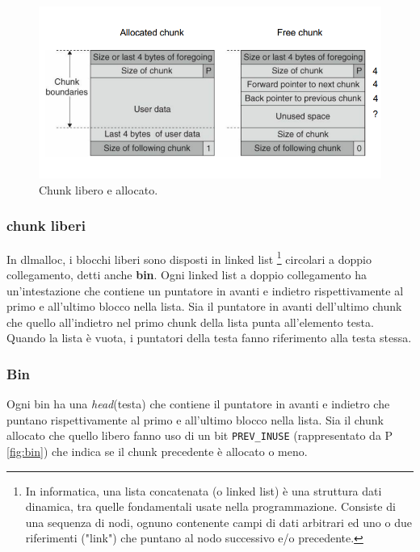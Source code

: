 \begin{figure}[H]
    \centering
    \includegraphics[width=13cm, keepaspectratio]{capitoli/secure_coding//img/cap_4/chuncks.png}
    \caption{Chunk libero e allocato.}\label{fig:chunk_lib_alloc}
\end{figure}

\subsubsection{chunk liberi}

In dlmalloc, i blocchi liberi sono disposti in linked list
\footnote{In informatica, una lista concatenata (o linked list) è una struttura dati
    dinamica, tra quelle fondamentali usate nella programmazione.
    Consiste di una sequenza di nodi, ognuno contenente campi di dati arbitrari ed
    uno o due riferimenti ("link") che puntano al nodo successivo e/o
    precedente.}
circolari a doppio collegamento, detti anche \textbf{bin}.
Ogni linked list a doppio collegamento ha un'intestazione che contiene un puntatore
in avanti e indietro rispettivamente al primo e all'ultimo blocco
nella lista. Sia il puntatore in avanti dell'ultimo chunk che quello all'indietro nel
primo chunk della lista punta all'elemento testa.
Quando la lista è vuota, i puntatori della testa fanno riferimento alla testa stessa.

\subsubsection{Bin}

Ogni bin ha una \textit{head}(testa) che contiene il puntatore in avanti e indietro
che puntano rispettivamente al primo e all'ultimo blocco nella lista. Sia il chunk
allocato che quello libero fanno uso di un bit \verb|PREV_INUSE|
(rappresentato da P \ref{fig:bin}) che indica se il chunk precedente è allocato o
meno.


